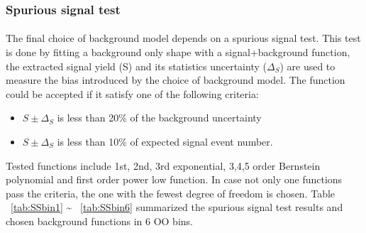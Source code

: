 \subsubsection{Spurious signal test}
\label{sssub:sstest}

\paragraph{} The final choice of background model depends on a spurious signal test. This test is done by fitting a background only shape with a signal+background function, the extracted signal yield (S) and its statistics uncertainty ($\Delta_S$) are used to measure the bias introduced by the choice of background model. The function could be accepted if it satisfy one of the following criteria: 

\begin{itemize}
\item{} $S\pm \Delta_S $ is less than 20\% of the background uncertainty
\item{} $S\pm \Delta_S $ is less than 10\% of expected signal event number. 
\end{itemize}

Tested functions include 1st, 2nd, 3rd exponential, 3,4,5 order Bernstein polynomial and first order power low function. In case not only one functions pass the criteria, the one with the fewest degree of freedom is chosen. Table ~\ref{tab:SSbin1} \~ ~\ref{tab:SSbin6} summarized the spurious signal test results and chosen background functions in 6 OO bins. 

